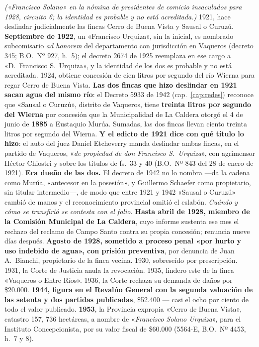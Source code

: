 \begin{personas}
\item[{\textbf{Francisco S.\ Urquiza\index{Urquiza, Francisco S.}}}] \textit{(«Francisco Solano» en la nómina de presidentes de comicio insaculados para 1928, circuito 6; la identidad es probable y no está acreditada.)} 1921, hace deslindar judicialmente las fincas Cerro de Buena Vista y Sausal o Curuzú. \textbf{Septiembre de 1922}, un «Francisco Urquiza», sin la inicial, es nombrado subcomisario \textit{ad honorem} del departamento con jurisdicción en Vaqueros (decreto 345; B.O.\ Nº 927, h.\ 5); el decreto 2674 de 1925 reemplaza en ese cargo a «D.\ Francisco S.\ Urquiza», y la identidad de los dos es probable y no está acreditada. 1924, obtiene concesión de cien litros por segundo del río Wierna para regar Cerro de Buena Vista. \textbf{Las dos fincas que hizo deslindar en 1921 sacan agua del mismo río}: el Decreto 5933 de 1942 (cap.\ \ref{cap:redes}) reconoce que «Sausal o Curuzú», distrito de Vaqueros, tiene \textbf{treinta litros por segundo del Wierna} por concesión que la Municipalidad de La Caldera otorgó el 4 de junio de \textbf{1885} a Eustaquio Murúa. Sumadas, las dos fincas llevan ciento treinta litros por segundo del Wierna. \textbf{Y el edicto de 1921 dice con qué título lo hizo}: el auto del juez Daniel Etcheverry manda deslindar ambas fincas, en el partido de Vaqueros, «\textit{de propiedad de don Francisco S.\ Urquiza}», con agrimensor Héctor Chiostri y sobre los títulos de fs.\ 33 y 40 (B.O.\ Nº 843 del 28 de enero de 1921). \textbf{Era dueño de las dos.} El decreto de 1942 no lo nombra ---da la cadena como Murúa, «antecesor en la posesión», y Guillermo Schaefer como propietario, sin titular intermedio---, de modo que entre 1921 y 1942 «Sausal o Curuzú» cambió de manos y el reconocimiento provincial omitió el eslabón. \textit{Cuándo y cómo se transfirió se contesta con el folio.} \textbf{Hasta abril de 1928, miembro de la Comisión Municipal de La Caldera}, cuyo informe sustenta ese mes el rechazo del reclamo de Campo Santo contra su propia concesión; renuncia nueve días después. \textbf{Agosto de 1928, sometido a proceso penal «por hurto y uso indebido de agua», con prisión preventiva}, por denuncia de Juan A.\ Bianchi, propietario de la finca vecina. 1930, sobreseído por prescripción. 1931, la Corte de Justicia anula la revocación. 1935, lindero este de la finca «Vaqueros o Entre Ríos». 1936, la Corte rechaza su demanda de daños por \$20.000. \textbf{1944, figura en el Revalúo General con la segunda valuación de las setenta y dos partidas publicadas}, \$52.400 --- casi el ocho por ciento de todo el valor publicado. \textbf{1953}, la Provincia expropia «Cerro de Buena Vista», catastro 157, 736 hectáreas, a nombre de «\textit{Francisco Solano Urquiza}», para el Instituto Concepcionista, por su valor fiscal de \$60.000 (5564-E, B.O.\ Nº 4453, h.\ 7 y 8).


\end{personas}
